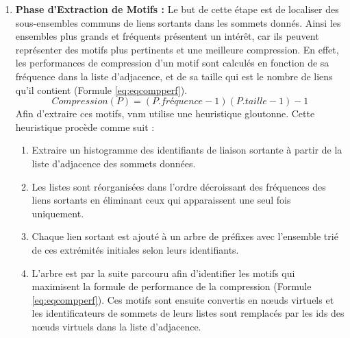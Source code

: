 \begin{enumerate}
					\item \textbf{Phase d'Extraction de Motifs :}				Le but de cette étape est de localiser des sous-ensembles communs de liens sortants dans les sommets donnés. 
				Ainsi les ensembles plus grands et fréquents présentent un intérêt, car ils peuvent représenter des motifs plus pertinents et une meilleure compression. En effet, les performances de compression d'un motif sont calculés en fonction de sa fréquence dans la liste d'adjacence, et de sa taille qui est le nombre de liens qu'il contient (Formule \ref{eq:eqcompperf}).
				\begin{equation}
				Compression(P)=(P.fréquence-1)(P.taille-1)-1
				\label{eq:eqcompperf}
				\end{equation}
				Afin d'extraire ces motifs, \gls{vnm}  utilise une heuristique gloutonne. Cette heuristique procède comme suit :
				\begin{enumerate}
				\item Extraire un histogramme des identifiants de liaison sortante à partir de la liste d'adjacence des sommets données.
				\item Les listes sont réorganisées dans l'ordre décroissant des fréquences des liens sortants en éliminant ceux qui apparaissent une seul fois uniquement.
				\item Chaque lien sortant est ajouté à un arbre de préfixes avec l'ensemble trié de ces extrémités initiales selon leurs identifiants. 
				\item L'arbre est par la suite parcouru afin d'identifier les motifs qui maximisent la formule de performance de la compression (Formule \ref{eq:eqcompperf}). Ces motifs sont ensuite convertis en nœuds virtuels et les identificateurs de sommets de leurs listes sont remplacés par les ids des nœuds virtuels dans la liste d'adjacence.
				\end{enumerate}
				 
				\end{enumerate}
				

